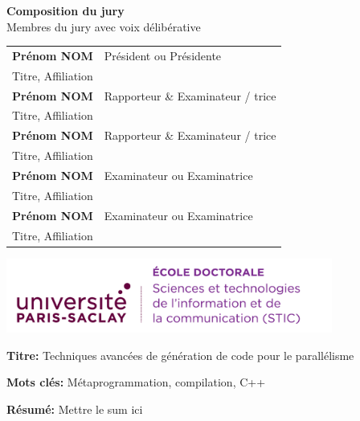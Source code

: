 \documentclass[english,12pt,a4paper]{book}
\begin{document}
\begin{titlepage}
\vspace{\fill} %

\bigskip

\flushleft
\small {\color{Prune} \textbf{Composition du jury}}\\
{\color{Prune} \scriptsize {Membres du jury avec voix délibérative}} \\
\vspace{2mm}
\scriptsize
\begin{tabular}{|p{7cm}l}
\arrayrulecolor{Prune}
\textbf{Prénom NOM} &   Président ou Présidente\\ 
Titre, Affiliation & \\
\textbf{Prénom NOM} &  Rapporteur \& Examinateur / trice \\ 
Titre, Affiliation   &   \\ 
\textbf{Prénom NOM} &  Rapporteur \& Examinateur / trice \\ 
Titre, Affiliation  &   \\ 
\textbf{Prénom NOM} &  Examinateur ou Examinatrice \\ 
Titre, Affiliation   &   \\ 
\textbf{Prénom NOM} &  Examinateur ou Examinatrice \\ 
Titre, Affiliation   &   \\ 
 
\end{tabular} 

\end{titlepage}

\thispagestyle{empty}

\noindent
\includegraphics[height=2.45cm]{ups/logo_STIC.png}
\vspace{1cm}

\small

\begin{mdframed}[linecolor=Prune,linewidth=1]

\textbf{Titre:} Techniques avanc\'ees de g\'en\'eration de code pour le
parall\'elisme

\noindent \textbf{Mots clés:} M\'etaprogrammation, compilation, C++ %

\vspace{-.5cm}
\begin{multicols}{2}
\noindent \textbf{Résumé:} Mettre le sum ici %
\end{multicols}

\end{mdframed}
\end{document}
